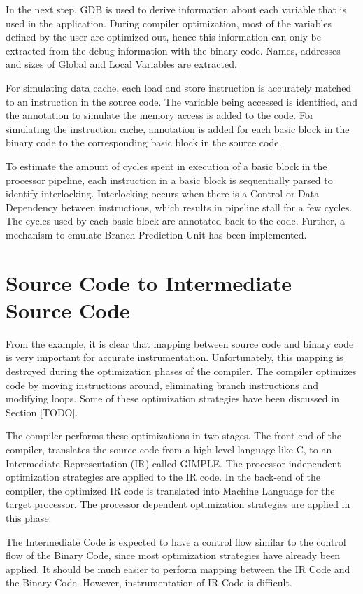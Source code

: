 In the next step, GDB is used to derive information about each variable that is used in the application. During compiler optimization, most of the variables defined by the user are optimized out, hence this information can only be extracted from the debug information with the binary code. Names, addresses and sizes of Global and Local Variables are extracted.

For simulating data cache, each load and store instruction is accurately matched to an instruction in the source code. The variable being accessed is identified, and the annotation to simulate the memory access is added to the code. For simulating the instruction cache, annotation is added for each basic block in the binary code to the corresponding basic block in the source code.

To estimate the amount of cycles spent in execution of a basic block in the processor pipeline, each instruction in a basic block is sequentially parsed to identify interlocking. Interlocking occurs when there is a Control or Data Dependency between instructions, which results in pipeline stall for a few cycles. The cycles used by each basic block are annotated back to the code. Further, a mechanism to emulate Branch Prediction Unit has been implemented. 

\section{Source Code to Intermediate Source Code}
From the example, it is clear that mapping between source code and binary code is very important for accurate instrumentation. Unfortunately, this mapping is destroyed during the optimization phases of the compiler. The compiler optimizes code by moving instructions around, eliminating branch instructions and modifying loops. Some of these optimization strategies have been discussed in Section [TODO].

The compiler performs these optimizations in two stages. The front-end of the compiler, translates the source code from a high-level language like C, to an Intermediate Representation (IR) called GIMPLE. The processor independent optimization strategies are applied to the IR code. In the back-end of the compiler, the optimized IR code is translated into Machine Language for the target processor. The processor dependent optimization strategies are applied in this phase.

The Intermediate Code is expected to have a control flow similar to the control flow of the Binary Code, since most optimization strategies have already been applied. It should be much easier to perform mapping between the IR Code and the Binary Code. However, instrumentation of IR Code is difficult. 

